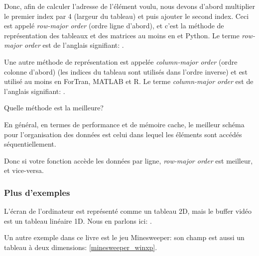 
Donc, afin de calculer l'adresse de l'élément voulu, nous devons d'abord multiplier
le premier index par 4 (largeur du tableau) et puis ajouter le second index.
Ceci est appelé \emph{row-major order} (ordre ligne d'abord),
et c'est la méthode de représentation des tableaux et des matrices au moins en \CCpp
et Python.
Le terme \emph{row-major order} est de l'anglais signifiant: .

Une autre méthode de représentation est appelée \emph{column-major order} (ordre colonne
d'abord) (les indices du tableau sont utilisés dans l'ordre inverse) et est utilisé
au moins en ForTran, MATLAB et R.
Le terme \emph{column-major order} est de l'anglais signifiant: .

Quelle méthode est la meilleure?

En général, en termes de performance et de mémoire cache, le meilleur schéma pour
l'organisation des données est celui dans lequel les éléments sont accédés séquentiellement.

Donc si votre fonction accède les données par ligne, \emph{row-major order} est meilleur,
et vice-versa.





\subsubsection{Plus d'exemples}

L'écran de l'ordinateur est représenté comme un tableau 2D, mais le buffer vidéo
est un tableau linéaire 1D.
Nous en parlons ici: .

Un autre exemple dans ce livre est le jeu Minesweeper: son champ est aussi un tableau
à deux dimensions: \ref{minesweeper_winxp}.

